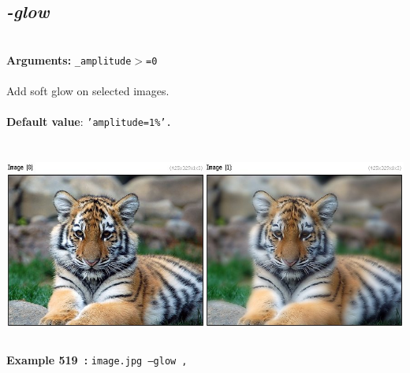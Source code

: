 \documentclass[a4paper,11pt,twoside]{book}
\begin{document}
\subsection{\emph{-glow} }\vspace*{-0.5em}
~\\\textbf{Arguments: } 
{\small \texttt{\_amplitude$>$=0}}\\~\\
Add soft glow on selected images.
~\\~\\\textbf{Default value}: {\small \texttt{'amplitude=1\%'.}}
\begin{center}\includegraphics[keepaspectratio=true,height=7cm,width=\textwidth]{img/gmic_def519.jpg}\\
{\footnotesize \textbf{Example 519~:} \texttt{image.jpg --glow ,}}
\end{center}
\end{document}
